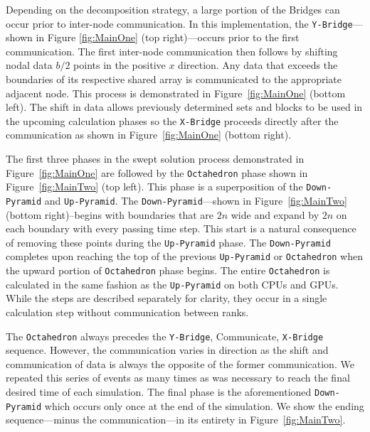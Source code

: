\documentclass[mca,article,submit,moreauthors,pdftex]{Definitions/mdpi}
\def\Up{\texttt{Up-Pyramid}}
\def\Down{\texttt{Down-Pyramid}}
\def\Oct{\texttt{Octahedron}}
\def\Xb{\texttt{X-Bridge}}
\def\Yb{\texttt{Y-Bridge}}
\begin{document}
\begin{paracol}{2}
\linenumbers
\switchcolumn

Depending on the decomposition strategy, a large portion of the Bridges can occur prior to inter-node communication. In this implementation, the \Yb{}---shown in Figure \ref{fig:MainOne} (top right)---occurs prior to the first communication. The first inter-node communication then follows by shifting nodal data $b/2$ points in the positive $x$ direction. Any data that exceeds the boundaries of its respective shared array is communicated to the appropriate adjacent node. This process is demonstrated in Figure~\ref{fig:MainOne} (bottom left). The shift in data allows previously determined sets and blocks to be used in the upcoming calculation phases so the \Xb{} proceeds directly after the communication as shown in Figure~\ref{fig:MainOne} (bottom right).

The first three phases in the swept solution process demonstrated in Figure~\ref{fig:MainOne} are followed by the \Oct{} phase shown in Figure~\ref{fig:MainTwo} (top left). This phase is a superposition of the \Down{} and \Up{}. The \Down{}---shown in Figure~\ref{fig:MainTwo} (bottom right)--begins with boundaries that are $2n$ wide and expand by $2n$ on each boundary with every passing time step. This start is a natural consequence of removing these points during the \Up{} phase. The \Down{} completes upon reaching the top of the previous \Up{} or \Oct{} when the upward portion of \Oct{} phase begins. The entire \Oct{} is calculated in the same fashion as the \Up{} on both CPUs and GPUs. While the steps are described separately for clarity, they occur in a single calculation step without communication between ranks. 

The \Oct{} always precedes the \Yb{}, Communicate, \Xb{} sequence. However, the communication varies in direction as the shift and communication of data is always the opposite of the former communication. We repeated this series of events as many times as was necessary to reach the final desired time of each simulation. The final phase is the aforementioned \Down{} which occurs only once at the end of the simulation. We show the ending sequence---minus the communication---in its entirety in Figure~\ref{fig:MainTwo}. 

\end{paracol}
\nointerlineskip
\end{document}
